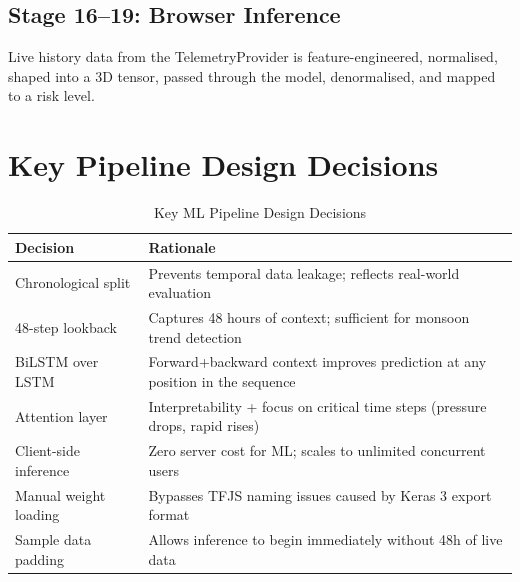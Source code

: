 \subsection{Stage 16--19: Browser Inference}
Live history data from the TelemetryProvider is feature-engineered, normalised, shaped into a 3D tensor, passed through the model, denormalised, and mapped to a risk level.

\section{Key Pipeline Design Decisions}

\begin{table}[H]
\centering
\caption{Key ML Pipeline Design Decisions}
\begin{tabularx}{\linewidth}{|l|X|}
\hline
\rowcolor{FloodLight}
\textbf{Decision} & \textbf{Rationale} \\
\hline
Chronological split & Prevents temporal data leakage; reflects real-world evaluation \\
48-step lookback & Captures 48 hours of context; sufficient for monsoon trend detection \\
BiLSTM over LSTM & Forward+backward context improves prediction at any position in the sequence \\
Attention layer & Interpretability + focus on critical time steps (pressure drops, rapid rises) \\
Client-side inference & Zero server cost for ML; scales to unlimited concurrent users \\
Manual weight loading & Bypasses TFJS naming issues caused by Keras 3 export format \\
Sample data padding & Allows inference to begin immediately without 48h of live data \\
\hline
\end{tabularx}
\end{table}
